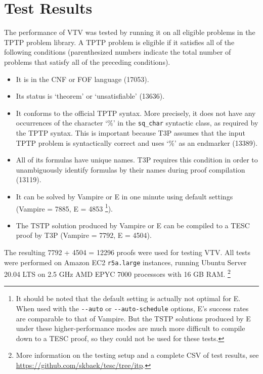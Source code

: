 \documentclass[12pt]{article}
\begin{document}
\section{Test Results} \label{sec:test-results}

The performance of VTV was tested by running it on all eligible problems 
in the TPTP \cite{sutcliffe2009tptp} problem library. A TPTP problem is eligible if it 
satisfies all of the following conditions (parenthesized numbers indicate 
the total number of problems that satisfy all of the preceding conditions).
\begin{itemize}
  \item It is in the CNF or FOF language (17053). 
  \item Its status is `theorem' or `unsatisfiable' (13636).
  \item It conforms to the official TPTP syntax. More precisely, 
    it does not have any occurrences of the character `\%' in the 
    \verb|sq_char| syntactic class, as required by the TPTP syntax.
    This is important because T3P assumes that the input TPTP problem 
    is syntactically correct and uses `\%' as an endmarker (13389).
  \item All of its formulas have unique names. T3P requires this condition 
    in order to unambiguously identify formulas by their names during 
    proof compilation (13119).
  \item It can be solved by Vampire \cite{riazanov2002design} or E \cite{schulz2002brainiac} 
      in one minute using default settings (Vampire = 7885, E = 4853 \footnote{
      It should be noted that the default setting is actually not 
      optimal for E. When used with the \verb|--auto| or \verb|--auto-schedule|
      options, E's success rates are comparable to that of Vampire. 
      But the TSTP solutions produced by E under these higher-performance modes 
      are much more difficult to compile down to a TESC proof, so they 
      could not be used for these tests.
    }).
  \item The TSTP solution produced by Vampire or E can be compiled to 
    a TESC proof by T3P (Vampire = 7792, E = 4504).
\end{itemize}
The resulting 7792 + 4504 = 12296 proofs were used for testing VTV.
All tests were performed on Amazon EC2 \texttt{r5a.large} instances, 
running Ubuntu Server 20.04 LTS on 2.5 GHz AMD EPYC 7000 processors with 
16 GB RAM. 
\footnote{
  More information on the testing setup and a complete CSV of test results,
  see \url{https://github.com/skbaek/tesc/tree/itp}.
}
\end{document}
